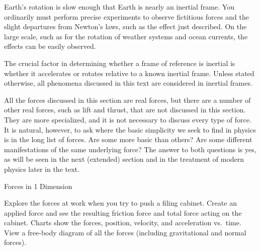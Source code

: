 \documentclass[
]{book}
\newenvironment{note}{}{}
\begin{document}
Earth's rotation is slow enough that Earth is nearly an inertial frame.
You ordinarily must perform precise experiments to observe fictitious
forces and the slight departures from Newton's laws, such as the effect
just described. On the large scale, such as for the rotation of weather
systems and ocean currents, the effects can be easily observed.

The crucial factor in determining whether a frame of reference is
inertial is whether it accelerates or rotates relative to a known
inertial frame. Unless stated otherwise, all phenomena discussed in this
text are considered in inertial frames.

All the forces discussed in this section are real forces, but there are
a number of other real forces, such as lift and thrust, that are not
discussed in this section. They are more specialized, and it is not
necessary to discuss every type of force. It is natural, however, to ask
where the basic simplicity we seek to find in physics is in the long
list of forces. Are some more basic than others? Are some different
manifestations of the same underlying force? The answer to both
questions is yes, as will be seen in the next (extended) section and in
the treatment of modern physics later in the text.

\hypertarget{eip-456}{}
\begin{note}

Forces in 1 Dimension

Explore the forces at work when you try to push a filing cabinet. Create
an applied force and see the resulting friction force and total force
acting on the cabinet. Charts show the forces, position, velocity, and
acceleration vs.~time. View a free-body diagram of all the forces
(including gravitational and normal forces).

\hypertarget{forces_in_1_direction}{}

\end{note}
\end{document}
